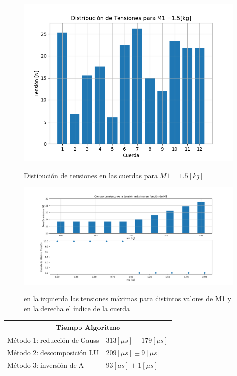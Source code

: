 \documentclass[a4paper, 11pt, spanish]{article}
\begin{document}
\begin{figure}[h]
\centering
\includegraphics[scale=0.7]{dist_tensiones.png}
\label{dist}
\caption{Distibución de tensiones en las cuerdas para $M1 = 1.5[kg]$} 
\end{figure} 

\begin{figure}[h]
\centering
\includegraphics[scale=0.4]{tensionesmaximas_0.png}
\label{tmax}
\caption{en la izquierda las tensiones máximas para distintos valores de M1 y en la derecha el índice de la cuerda} 
\end{figure} 

\begin{table}[h]
\centering
\begin{tabular}{|l|l|}
\hline
\multicolumn{2}{|c|}{\textbf{Tiempo Algoritmo}}               \\ \hline
Método 1: reducción de Gauss & $313  [\mu s] \pm 179 [\mu s]$ \\ \hline
Método 2: descomposición LU  & $209 [\mu s] \pm 9 [\mu s]$    \\ \hline
Método 3: inversión de A     & $93 [\mu s] \pm 1 [\mu s]$     \\ \hline
\end{tabular}
\end{table}
\end{document}

